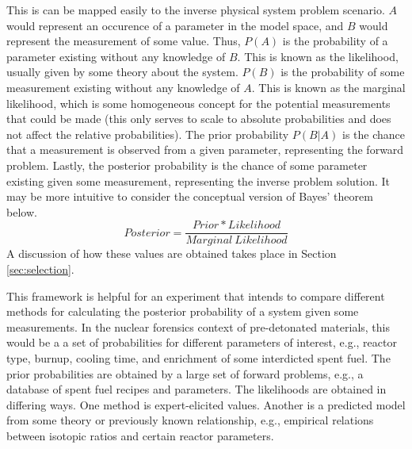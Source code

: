 This is can be mapped easily to the inverse physical system problem scenario.
$A$ would represent an occurence of a parameter in the model space, and $B$
would represent the measurement of some value. Thus, $P(A)$ is the probability
of a parameter existing without any knowledge of $B$. This is known as the
likelihood, usually given by some theory about the system. $P(B)$ is the
probability of some measurement existing without any knowledge of $A$. This is
known as the marginal likelihood, which is some homogeneous concept for the
potential measurements that could be made (this only serves to scale to
absolute probabilities and does not affect the relative probabilities). The
prior probability $P(B|A)$ is the chance that a measurement is observed from a
given parameter, representing the forward problem.  Lastly, the posterior
probability is the chance of some parameter existing given some measurement,
representing the inverse problem solution.  It may be more intuitive to
consider the conceptual version of Bayes' theorem below.  
\begin{equation}
Posterior = \frac{Prior * Likelihood}{Marginal \ Likelihood} 
\end{equation} 
A discussion of how these values are obtained takes place in Section
\ref{sec:selection}.

This framework is helpful for an experiment that intends to compare different
methods for calculating the posterior probability of a system given some
measurements.  In the nuclear forensics context of pre-detonated materials,
this would be a a set of probabilities for different parameters of interest,
e.g., reactor type, burnup, cooling time, and enrichment of some interdicted
spent fuel. The prior probabilities are obtained by a large set of forward
problems, e.g., a database of spent fuel recipes and parameters. The
likelihoods are obtained in differing ways. One method is expert-elicited
values. Another is a predicted model from some theory or previously known
relationship, e.g., empirical relations between isotopic ratios and certain
reactor parameters. 
